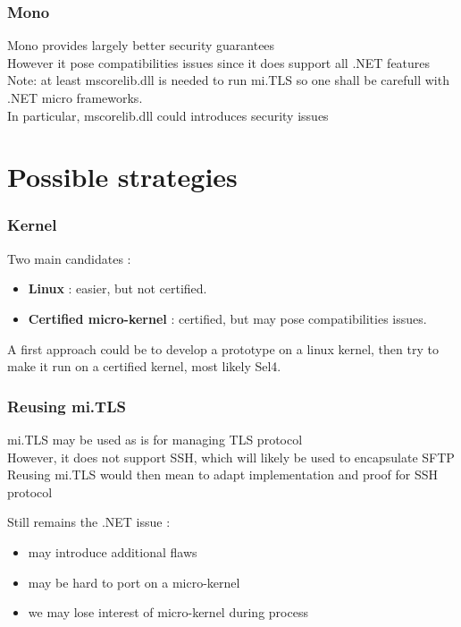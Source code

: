 \documentclass{beamer}
\begin{document}
\begin{frame}
\frametitle{Mono}

Mono provides largely better security guarantees\\
However it pose compatibilities issues since it does support all .NET features\\

    \vfill
    Note: at least mscorelib.dll is needed to run mi.TLS so one shall be carefull with .NET micro frameworks.\\
In particular, mscorelib.dll could introduces security issues

\end{frame}


\section{Possible strategies}

\begin{frame}
\frametitle{Kernel}
Two main candidates :
\begin{itemize}
\item \textbf{Linux} : easier, but not certified.
\item \textbf{Certified micro-kernel} : certified, but may pose compatibilities issues.
\end{itemize}

A first approach could be to develop a prototype on a linux kernel, then try to make it run on a certified kernel, most likely Sel4.

\end{frame}



\begin{frame}
\frametitle{Reusing mi.TLS}
mi.TLS may be used as is for managing TLS protocol\\

However, it does not support SSH, which will likely be used to encapsulate SFTP
Reusing mi.TLS would then mean to adapt implementation and proof for SSH protocol

Still remains the .NET issue :
\begin{itemize}
\item may introduce additional flaws
\item may be hard to port on a micro-kernel
\item we may lose interest of micro-kernel during process
\end{itemize}

\end{frame}
\end{document}
